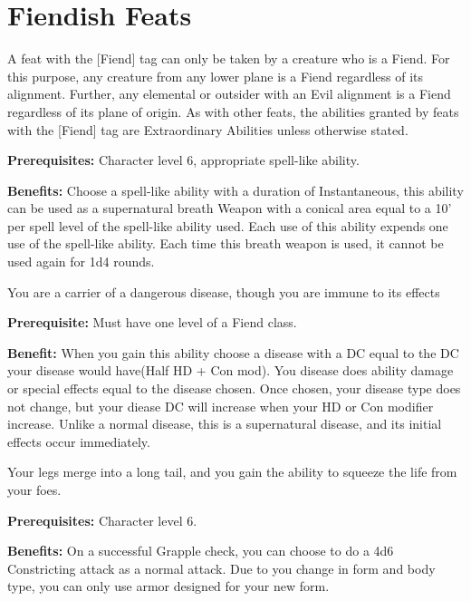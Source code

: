 \section{Fiendish Feats}

A feat with the [Fiend] tag can only be taken by a creature who is a Fiend. For this purpose, any creature from any lower plane is a Fiend regardless of its alignment. Further, any elemental or outsider with an Evil alignment is a Fiend regardless of its plane of origin. As with other feats, the abilities granted by feats with the [Fiend] tag are Extraordinary Abilities unless otherwise stated.


\textbf{Prerequisites:} Character level 6, appropriate spell-like ability.

\textbf{Benefits:} Choose a spell-like ability with a duration of Instantaneous, this ability can be used as a supernatural breath Weapon with a conical area equal to a 10' per spell level of the spell-like ability used. Each use of this ability expends one use of the spell-like ability. Each time this breath weapon is used, it cannot be used again for 1d4 rounds.


You are a carrier of a dangerous disease, though you are immune to its effects

\textbf{Prerequisite:} Must have one level of a Fiend class.

\textbf{Benefit:} When you gain this ability choose a disease with a DC equal to the DC your disease would have(Half HD + Con mod). You disease does ability damage or special effects equal to the disease chosen. Once chosen, your disease type does not change, but your diease DC will increase when your HD or Con modifier increase. Unlike a normal disease, this is a supernatural disease, and its initial effects occur immediately.


Your legs merge into a long tail, and you gain the ability to squeeze the life from your foes.

\textbf{Prerequisites:} Character level 6.

\textbf{Benefits:} On a successful Grapple check, you can choose to do a 4d6 Constricting attack as a normal attack. Due to you change in form and body type, you can only use armor designed for your new form.


